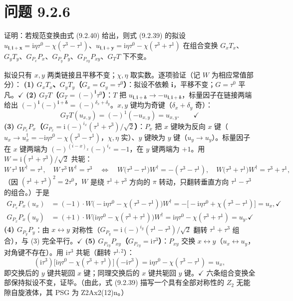 \section*{问题 9.2.6}
\begin{problem}
证明：若规范变换由式 (9.2.40) 给出，则式 (9.2.39) 的拟设 $u_{\pmb{i},\pmb{i}+\pmb{x}}=\mathrm{i}\eta\tau^0-\chi(\tau^3-\tau^1)$、$u_{\pmb{i},\pmb{i}+\pmb{y}}=\mathrm{i}\eta\tau^0-\chi(\tau^3+\tau^1)$ 在组合变换 $G_xT_x$、$G_yT_y$、$G_{P_x}P_x$、$G_{P_y}P_y$、$G_{P_{xy}}P_{xy}$、$G_TT$ 下不变。
\end{problem}
\solution
拟设只有 $x,y$ 两类链接且平移不变；$\chi,\eta$ 取实数。逐项验证（记 $W$ 为相应常值部分）：
\textbf{(1) $G_xT_x$、$G_yT_y$（$G_x=G_y=\tau^0$）}：拟设不依赖 $\pmb{i}$，平移不变；$G=\tau^0$ 平凡。$\checkmark$
\textbf{(2) $G_TT$（$G_T=(-)^{\pmb{i}}\tau^0$）}：$T$ 把 $u_{\pmb{i},\pmb{i}+\pmb{\delta}}\to-u_{\pmb{i},\pmb{i}+\pmb{\delta}}$，标量因子在链接两端给出 $(-)^{\pmb{i}}(-)^{\pmb{i}+\pmb{\delta}}=(-)^{\delta_x+\delta_y}$。$x,y$ 键均为奇键（$\delta_x+\delta_y$ 奇）：
\begin{equation*}
G_TT(u_{x,y})=(-)^{1}(-u_{x,y})=u_{x,y}.\qquad\checkmark
\end{equation*}
\textbf{(3) $G_{P_x}P_x$（$G_{P_x}=\mathrm{i}(-)^{i_x}(\tau^1+\tau^3)/\sqrt2$）}：$P_x$ 把 $x$ 键映为反向 $x$ 键（$u_x\to u_x^{\dagger}=-\mathrm{i}\eta\tau^0-\chi(\tau^3-\tau^1)$，$\chi,\eta$ 实）、$y$ 键映为 $y$ 键（$u_y\to u_y$）。标量因子在 $x$ 键两端为 $(-)^{(i-x)_x}(-)^{i_x}=-1$，在 $y$ 键两端为 $+1$。用 $W=\mathrm{i}(\tau^1+\tau^3)/\sqrt2$ 共轭：
\begin{equation*}
W\,\tau^1\,W^{\dagger}=\tau^1,\quad W\,\tau^3\,W^{\dagger}=\tau^3
\quad\Longleftrightarrow\quad
W\big(\tau^3-\tau^1\big)W^{\dagger}=-(\tau^3-\tau^1),\quad
W\big(\tau^3+\tau^1\big)W^{\dagger}=\tau^3+\tau^1 ,
\end{equation*}
（因 $(\tau^1+\tau^3)^2=2\tau^0$，$W$ 是绕 $\tau^1+\tau^3$ 方向的 $\pi$ 转动，只翻转垂直方向 $\tau^1-\tau^3$ 的组合。）于是
\begin{align*}
G_{P_x}P_x(u_x)&=(-1)\cdot W\big(-\mathrm{i}\eta\tau^0-\chi(\tau^3-\tau^1)\big)W^{\dagger}
=-\big[-\mathrm{i}\eta\tau^0+\chi(\tau^3-\tau^1)\big]=u_x ,\checkmark\\
G_{P_x}P_x(u_y)&=(+1)\cdot W\big(\mathrm{i}\eta\tau^0-\chi(\tau^3+\tau^1)\big)W^{\dagger}
=\mathrm{i}\eta\tau^0-\chi(\tau^3+\tau^1)=u_y .\checkmark
\end{align*}
\textbf{(4) $G_{P_y}P_y$}：由 $x\leftrightarrow y$ 对称性（$G_{P_y}=\mathrm{i}(-)^{i_y}(\tau^1-\tau^3)/\sqrt2$ 翻转 $\tau^1+\tau^3$ 组合），与 (3) 完全平行。$\checkmark$
\textbf{(5) $G_{P_{xy}}P_{xy}$（$G_{P_{xy}}=\mathrm{i}\tau^3$）}：$P_{xy}$ 交换 $x\leftrightarrow y$（$u_x\leftrightarrow u_y$，对角键不存在）。用 $\mathrm{i}\tau^3$ 共轭（翻转 $\tau^{1,2}$）：
\begin{equation*}
(\mathrm{i}\tau^3)\big[\mathrm{i}\eta\tau^0-\chi(\tau^3+\tau^1)\big](-\mathrm{i}\tau^3)
=\mathrm{i}\eta\tau^0-\chi(\tau^3-\tau^1)=u_x ,
\end{equation*}
即交换后的 $y$ 键共轭回 $x$ 键；同理交换后的 $x$ 键共轭回 $y$ 键。$\checkmark$
六条组合变换全部保持拟设不变，证毕。（由此，式 (9.2.39) 描写一个具有全部对称性的 $Z_2$ 无能隙自旋液体，其 PSG 为 Z2Ax2(12)n。）

